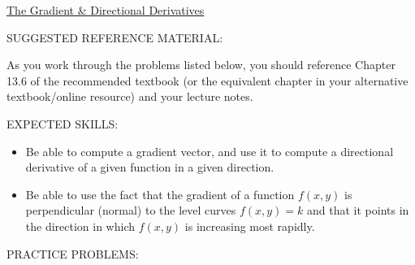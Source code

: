 \documentclass[12pt]{article}
\begin{document}
\begin{center}
\underline{\LARGE{The Gradient \& Directional Derivatives}}
\end{center}

\noindent SUGGESTED REFERENCE MATERIAL:

\bigskip

\noindent As you work through the problems listed below, you should reference Chapter 13.6 of the recommended textbook (or the equivalent chapter in your alternative textbook/online resource) and your lecture notes.

\bigskip


\noindent EXPECTED SKILLS:

\begin{itemize}

\item Be able to compute a gradient vector, and use it to compute a directional derivative of a given function in a given direction. 

\item Be able to use the fact that the gradient of a function $f(x,y)$ is perpendicular (normal) to the level curves $f(x,y)=k$ and that it points in the direction in which $f(x,y)$ is increasing most rapidly.

\end{itemize}

\noindent PRACTICE PROBLEMS:

\medskip

\end{document}
